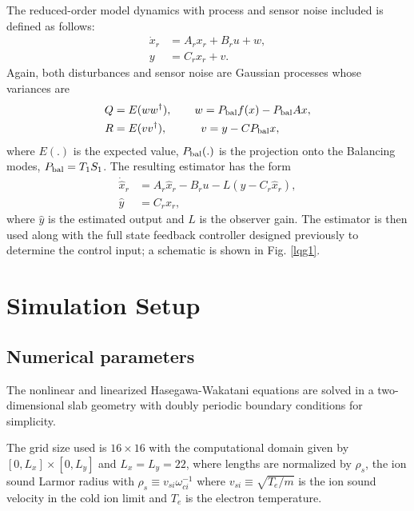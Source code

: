 \documentclass[12pt,lot, lof]{puthesis}
\begin{document}
The reduced-order model dynamics with process and sensor noise included is defined as follows:
\begin{equation}
\begin{aligned}
	\dot{x}_r &= {A}_r x_r  + {B}_r u +w,   \\
	y &= {C}_r x_r +v.
\end{aligned}
\end{equation}
Again, both disturbances and sensor noise are Gaussian processes whose variances are
\begin{subequations}
\begin{align}
Q &= E(ww^\dagger), \qquad w = P_{\rm bal} f(x) -  P_{\rm bal} {A} x \label{error1},   \\
R &= E(v v^\dagger),  \qquad \quad  v = y -  {C} P_{\rm bal} x \label{error2},
\end{align}
\end{subequations}
where $E(.)$ is the expected value, $P_{\rm bal}(.)$ is the projection onto the Balancing modes, $P_{\rm bal} = T_1 S_1$. The resulting estimator has the form
\begin{equation}
\begin{aligned}
	\dot{\hat{x}}_r &= {A}_r \hat{x}_r  - {B}_r u - L (y - {C}_r \hat{x}_r) ,   \\
	\hat{y} &= {C}_r x_r,
\end{aligned}
\end{equation}
where $\hat{y}$ is the estimated output and $L$ is the observer gain. The estimator is then used along with the full state feedback controller designed previously to determine the control input; a schematic is shown in Fig. \ref{lqg1}.

\section{Simulation Setup}
\label{Setup}

\subsection{Numerical parameters}
\label{num}
The nonlinear and linearized Hasegawa-Wakatani equations are solved in a two-dimensional slab geometry with doubly periodic boundary conditions for simplicity.

The grid size used is $16 \times 16$ with the computational domain given by $\left[ 0, L_x \right] \times \left[ 0 , L_y \right] $ and $L_x =L_y =22$, where lengths are normalized by $\rho_s$, the ion sound Larmor radius with $\rho_s \equiv v_{si} \omega_{ci}^{-1}$ where $v_{si} \equiv \sqrt{T_e/ m}$ is the ion sound velocity in the cold ion limit and $T_e$ is the electron temperature.
\end{document}
